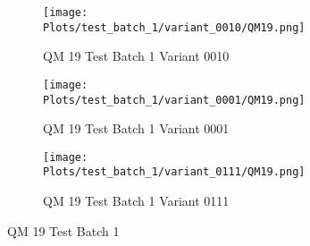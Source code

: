 \documentclass{DissertateFigs}
\begin{document}
\begin{figure}[t!]
\medskip

    \begin{subfigure}{0.47\textwidth}
    \texttt{[image: Plots/test\_batch\_1/variant\_0010/QM19.png]}
    \caption{QM 19 Test Batch 1 Variant 0010}
    \end{subfigure}
    \begin{subfigure}{0.47\textwidth}
    \texttt{[image: Plots/test\_batch\_1/variant\_0001/QM19.png]}
    \caption{QM 19 Test Batch 1 Variant 0001}
    \end{subfigure}

\medskip

    \begin{subfigure}{0.47\textwidth}
    \texttt{[image: Plots/test\_batch\_1/variant\_0111/QM19.png]}
    \caption{QM 19 Test Batch 1 Variant 0111}
    \end{subfigure}
\caption{QM 19 Test Batch 1}
    \end{figure}
\clearpage
\end{document}
